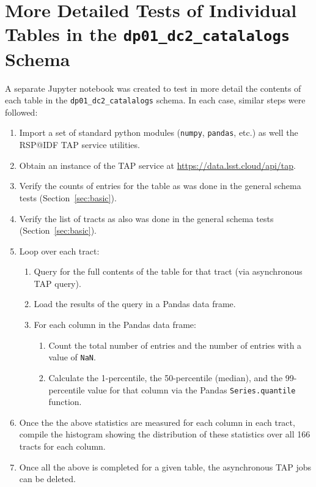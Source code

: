 \documentclass[DM,authoryear,toc]{lsstdoc}
\begin{document}
\section{More Detailed Tests of Individual Tables in the  \texttt{dp01\_dc2\_catalalogs} Schema} \label{sec:detailed}

A separate Jupyter notebook was created to test in more detail the
contents of each table in the \texttt{dp01\_dc2\_catalalogs} schema.
In each case, similar steps were followed:
\begin{enumerate}
\item Import a set of standard python modules (\texttt{numpy},
  \texttt{pandas}, etc.) as well the RSP@IDF TAP service utilities.
\item Obtain an instance of the TAP service at
  \url{https://data.lsst.cloud/api/tap}.
\item Verify the counts of entries for the table as was done in the
  general schema tests (Section~\ref{sec:basic}).
\item Verify the list of tracts as also was done in the general schema
  tests (Section~\ref{sec:basic}).
\item Loop over each tract:
  \begin{enumerate}
  \item Query for the full contents of the table for that tract (via
    asynchronous TAP query).
  \item Load the results of the query in a Pandas data frame.
  \item For each column in the Pandas data frame:
    \begin{enumerate}
    \item Count the total number of entries and the number of entries
      with a value of \texttt{NaN}.
    \item Calculate the 1-percentile, the 50-percentile (median), and the
      99-percentile value for that column via the Pandas
      \texttt{Series.quantile} function.
    \end{enumerate}
  \end{enumerate}
\item Once the the above statistics are measured for each column in
  each tract, compile the histogram showing the distribution of these
  statistics over all 166 tracts for each column.
\item Once all the above is completed for a given table, the
  asynchronous TAP jobs can be deleted.
\end{enumerate}
\end{document}
